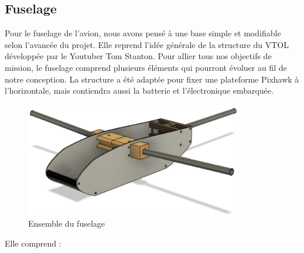 \documentclass[a4paper,12pt,french]{report}
\begin{document}
\subsection{Fuselage}

Pour le fuselage de l’avion, nous avons pensé à une base simple et modifiable selon l’avancée du projet. Elle reprend l’idée générale de la structure du VTOL développée par le Youtuber Tom Stanton. Pour allier tous nos objectifs de mission, le fuselage  comprend plusieurs éléments qui pourront évoluer au fil de notre conception. La structure a été adaptée pour fixer une plateforme Pixhawk à l’horizontale, mais contiendra aussi la batterie et l’électronique embarquée.

\begin{figure}[h]
    \centering
    \includegraphics[height=5cm]{figures/fuselageent.png}
    \caption{Ensemble du fuselage}
    \label{fus}
\end{figure}

Elle comprend :
\end{document}
